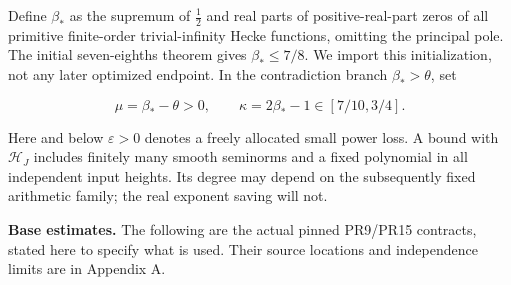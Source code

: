 \documentclass[11pt,a4paper]{article}
\begin{document}
Define \(\beta_*\) as the supremum of \(\frac{1}{2}\) and real parts of
positive-real-part zeros of all primitive finite-order trivial-infinity
Hecke functions, omitting the principal pole. The initial seven-eighths
theorem gives \(\beta_*\le7/8\). We import this initialization, not any
later optimized endpoint. In the contradiction branch
\(\beta_*>\theta\), set

\[
\mu=\beta_*-\theta>0,\qquad \kappa=2\beta_*-1\in[7/10,3/4].
\tag{1.3}
\]

Here and below \(\varepsilon>0\) denotes a freely allocated small power
loss. A bound with \(\mathcal H_J\) includes finitely many smooth
seminorms and a fixed polynomial in all independent input heights. Its
degree may depend on the subsequently fixed arithmetic family; the real
exponent saving will not.

\textbf{Base estimates.} The following are the actual pinned PR9/PR15
contracts, stated here to specify what is used. Their source locations
and independence limits are in Appendix A.
\end{document}
